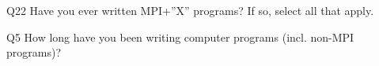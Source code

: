 \begin{description}%
\item{Q22} Have you ever written MPI+”X” programs? If so, select all that apply.%
\item{Q5} How long have you been writing computer programs (incl. non-MPI programs)?%
\end{description}%
